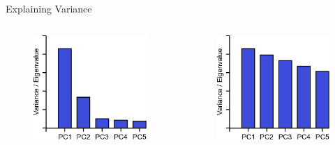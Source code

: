 \begin{frame}[allowframebreaks]{Explaining Variance}
    \framebreak

    \begin{columns}
    \begin{column}{0.5\textwidth}
        \begin{figure}
            \centering
            \includegraphics[width=1\textwidth,keepaspectratio]{images/dul/dim-reduce/variance-graph-1.png}
        \end{figure}
    \end{column}
    \begin{column}{0.5\textwidth}
        \begin{figure}
            \centering
            \includegraphics[width=1\textwidth,keepaspectratio]{images/dul/dim-reduce/variance-graph-2.png}
        \end{figure}
    \end{column}
    \end{columns}
\end{frame}


